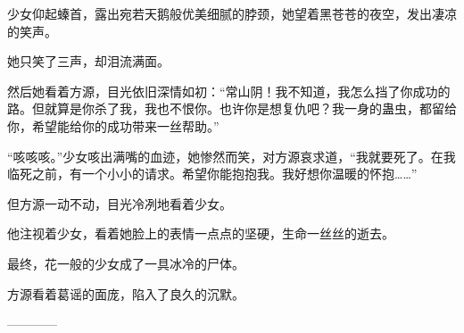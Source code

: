 \begin{this_body}
少女仰起螓首，露出宛若天鹅般优美细腻的脖颈，她望着黑苍苍的夜空，发出凄凉的笑声。

她只笑了三声，却泪流满面。

然后她看着方源，目光依旧深情如初：“常山阴！我不知道，我怎么挡了你成功的路。但就算是你杀了我，我也不恨你。也许你是想复仇吧？我一身的蛊虫，都留给你，希望能给你的成功带来一丝帮助。”

“咳咳咳。”少女咳出满嘴的血迹，她惨然而笑，对方源哀求道，“我就要死了。在我临死之前，有一个小小的请求。希望你能抱抱我。我好想你温暖的怀抱……”

但方源一动不动，目光冷冽地看着少女。

他注视着少女，看着她脸上的表情一点点的坚硬，生命一丝丝的逝去。

最终，花一般的少女成了一具冰冷的尸体。

方源看着葛谣的面庞，陷入了良久的沉默。

------------

\end{this_body}

